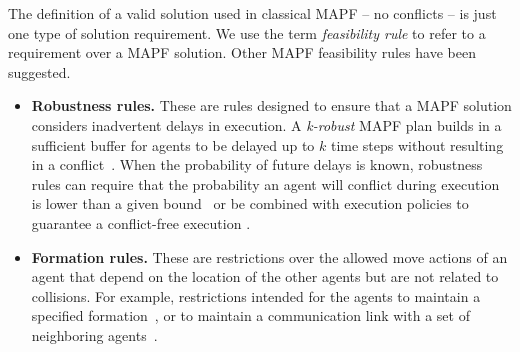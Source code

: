 \documentclass[letterpaper]{article} %
\newcommand{\mapf}{\ac{MAPF}\xspace}
\newcommand{\comment}[1]{{\nb{\textbf{Comment:}}{orange}{#1}}}
\begin{document}
The definition of a valid solution used in classical MAPF -- no conflicts -- is just one
type of solution requirement.
We use the term \emph{feasibility rule} to refer to a requirement over a \mapf solution. Other \mapf feasibility rules have been suggested.

\begin{itemize}
\item \textbf{Robustness rules.} These are rules designed to ensure that a \mapf solution considers inadvertent delays in execution. A \emph{k-robust} MAPF plan builds in a sufficient buffer for agents to be delayed up to $k$ time steps without resulting in a conflict~\cite{atzmon2018robust}.
When the probability of future delays is known, robustness rules can require that the probability an agent will conflict during execution is lower than a given bound~\cite{wagner2017path} or be combined with execution policies to guarantee a conflict-free execution \cite{MaAAAI17}.

\item \textbf{Formation rules.} These are restrictions over the allowed move actions of an agent that depend on the location of the other agents but are not related to collisions. For example, restrictions intended for the agents to maintain a specified formation~\cite{barel2017come}, or to maintain a communication link with a set of neighboring agents~\cite{stump2011visibility,gilboa2006distributed}.

\end{itemize}



\end{document}
